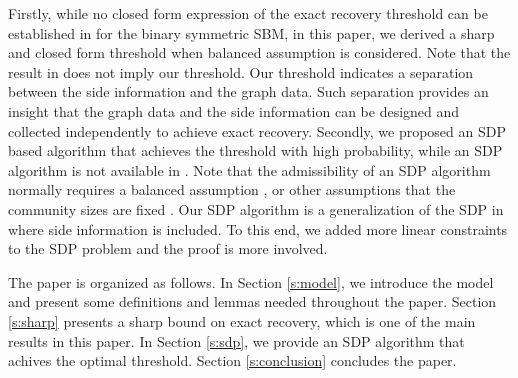\documentclass[conference]{IEEEtran}
\begin{document}
	
	Firstly, while no closed form expression of the exact recovery threshold can be established in \cite{abbe17sideinfo} for  the binary symmetric SBM, in this paper, we derived a sharp and closed form threshold when balanced assumption is considered. Note that the result in \cite{abbe17sideinfo} does not imply our threshold. Our threshold indicates a separation between the side information and the graph data. Such separation provides an insight that the graph data and the side information can be designed and collected independently to achieve exact recovery. 
	Secondly, we proposed an SDP based algorithm that achieves the threshold with high probability, while an SDP algorithm is not available in \cite{abbe17sideinfo}. Note that the admissibility of an SDP algorithm normally requires a balanced assumption \cite{abbe2015exact},
	\cite{esmaeili2019community} or other assumptions that the community sizes are fixed \cite{Hajek16}. Our SDP algorithm is a generalization of the SDP in \cite{abbe2015exact} where side information is included. To this end, we added more linear constraints to the SDP problem and the proof is more involved.
	
	The paper is organized as follows. 
	In Section \ref{s:model}, we introduce the model and present some definitions and lemmas needed throughout the paper. Section \ref{s:sharp} presents a sharp bound on exact recovery, which is one of the main results in this paper. In Section \ref{s:sdp}, we provide an SDP algorithm that achives the optimal threshold. Section \ref{s:conclusion} concludes the paper.
	
\end{document}
